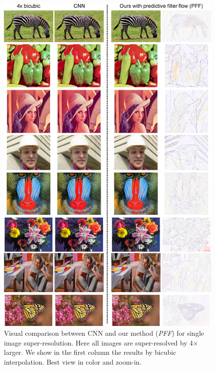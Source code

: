 \begin{figure}[t]
    \centering
    \begin{minipage}{0.77\textwidth}
        \centering
        \includegraphics[width=1\linewidth]{supple_sisr.png}
    \end{minipage}
    \caption{
    Visual comparison between CNN and our method (\emph{PFF}) for single image super-resolution.
    Here all images are super-resolved by 4$\times$ larger.
    We show in the first column the results by bicubic interpolation.
    Best view in color and zoom-in.}
    \label{fig:more_SISR}
\end{figure}

